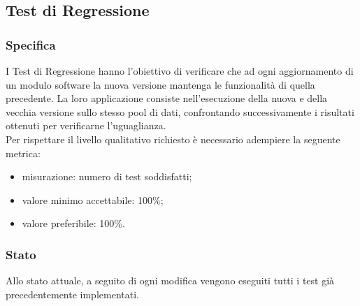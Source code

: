 \subsection{Test di Regressione}

	\subsubsection{Specifica}
		I Test di Regressione hanno l'obiettivo di verificare che ad ogni aggiornamento di un modulo software la nuova versione mantenga le funzionalità di quella precedente.
		La loro applicazione consiste nell'esecuzione della nuova e della vecchia versione sullo stesso pool di dati, confrontando successivamente i risultati ottenuti per verificarne l'uguaglianza.\\
		Per rispettare il livello qualitativo richiesto è necessario adempiere la seguente metrica:
		\begin{itemize}
			\item misurazione: numero di test soddisfatti;
			\item valore minimo accettabile: 100\%;
			\item valore preferibile: 100\%.
		\end{itemize}
	
	
	\subsubsection{Stato}
		Allo stato attuale, a seguito di ogni modifica vengono eseguiti tutti i test già precedentemente implementati.